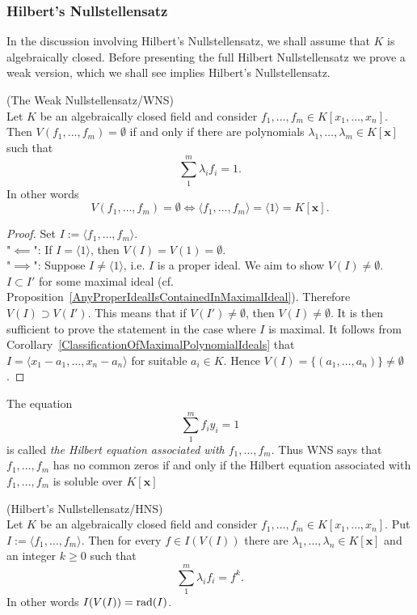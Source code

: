 \subsubsection{Hilbert's Nullstellensatz}
In the discussion involving Hilbert's Nullstellensatz, we shall assume that $K$ is algebraically closed.  Before presenting the full Hilbert Nullstellensatz we prove a weak version, which we shall see implies Hilbert's Nullstellensatz. 
\begin{theorem}(The Weak Nullstellensatz/WNS)\\
Let $K$ be an algebraically closed field and consider $f_1,\dots,f_m\in K[x_1,\dots,x_n]$. Then $V(f_1,\dots,f_m)=\emptyset$ if and only if there are polynomials $\lambda_1,\dots,\lambda_m\in K[\mathbf{x}]$ such that 
$$\sum_1^m \lambda_if_i = 1.$$
In other words 
$$V(f_1,\dots,f_m) = \emptyset \iff \langle f_1,\dots,f_m\rangle = \langle 1 \rangle = K[\mathbf{x}].$$
\end{theorem}
\begin{proof}
    Set $I:=\langle f_1,\dots,f_m\rangle$.\\
    "$\impliedby$": If $I = \langle 1\rangle $, then $V(I) = V(1) = \emptyset$.\\
    "$\implies$": Suppose $I\neq \langle 1 \rangle$, i.e. $I$ is a proper ideal. We aim to show $V(I)\neq \emptyset$. $I\subset I'$ for some maximal ideal (cf. Proposition~\ref{AnyProperIdealIsContainedInMaximalIdeal}). Therefore $V(I)\supset V(I')$. This means that if $V(I')\neq \emptyset$, then $V(I)\neq \emptyset$. It is then sufficient to prove the statement in the case where $I$ is maximal. It follows from Corollary~\ref{ClassificationOfMaximalPolynomialIdeals} that $I = \langle x_1-a_1,\dots,x_n-a_n\rangle$ for suitable $a_i\in K$. Hence $V(I) = \{(a_1,\dots,a_n)\}\neq \emptyset$.
\end{proof}
\begin{remark}
    The equation
    \begin{equation}\label{HilbertEquation}
        \sum_1^m f_iy_i = 1
    \end{equation}
    is called \textit{the Hilbert equation associated with $f_1,\dots,f_m$}. Thus WNS says that $f_1,\dots,f_m$ has no common zeros if and only if the Hilbert equation associated with $f_1,\dots,f_m$ is soluble over $K[\mathbf{x}]$
\end{remark}
\begin{theorem}(Hilbert's Nullstellensatz/HNS)\\  
    Let $K$ be an algebraically closed field and consider $f_1,\dots,f_m\in K[x_1,\dots,x_n]$. Put $I:= \langle f_1,\dots,f_m\rangle$. Then for every $f\in I(V(I))$ there are $\lambda_1,\dots,\lambda_n\in K[\mathbf{x}]$ and an integer $k\geq 0$ such that 
    $$\sum_1^m \lambda_if_i = f^k.$$
    In other words $I(V(I)) = \mathrm{rad}(I)$.
\end{theorem}
